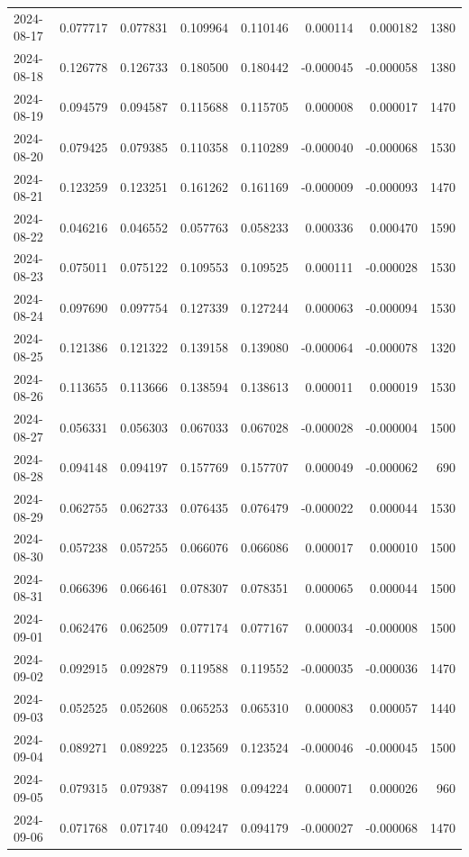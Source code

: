 \begin{tabular}{lrrrrrrr}
2024-08-17 & 0.077717 & 0.077831 & 0.109964 & 0.110146 & 0.000114 & 0.000182 & 1380 \\
2024-08-18 & 0.126778 & 0.126733 & 0.180500 & 0.180442 & -0.000045 & -0.000058 & 1380 \\
2024-08-19 & 0.094579 & 0.094587 & 0.115688 & 0.115705 & 0.000008 & 0.000017 & 1470 \\
2024-08-20 & 0.079425 & 0.079385 & 0.110358 & 0.110289 & -0.000040 & -0.000068 & 1530 \\
2024-08-21 & 0.123259 & 0.123251 & 0.161262 & 0.161169 & -0.000009 & -0.000093 & 1470 \\
2024-08-22 & 0.046216 & 0.046552 & 0.057763 & 0.058233 & 0.000336 & 0.000470 & 1590 \\
2024-08-23 & 0.075011 & 0.075122 & 0.109553 & 0.109525 & 0.000111 & -0.000028 & 1530 \\
2024-08-24 & 0.097690 & 0.097754 & 0.127339 & 0.127244 & 0.000063 & -0.000094 & 1530 \\
2024-08-25 & 0.121386 & 0.121322 & 0.139158 & 0.139080 & -0.000064 & -0.000078 & 1320 \\
2024-08-26 & 0.113655 & 0.113666 & 0.138594 & 0.138613 & 0.000011 & 0.000019 & 1530 \\
2024-08-27 & 0.056331 & 0.056303 & 0.067033 & 0.067028 & -0.000028 & -0.000004 & 1500 \\
2024-08-28 & 0.094148 & 0.094197 & 0.157769 & 0.157707 & 0.000049 & -0.000062 & 690 \\
2024-08-29 & 0.062755 & 0.062733 & 0.076435 & 0.076479 & -0.000022 & 0.000044 & 1530 \\
2024-08-30 & 0.057238 & 0.057255 & 0.066076 & 0.066086 & 0.000017 & 0.000010 & 1500 \\
2024-08-31 & 0.066396 & 0.066461 & 0.078307 & 0.078351 & 0.000065 & 0.000044 & 1500 \\
2024-09-01 & 0.062476 & 0.062509 & 0.077174 & 0.077167 & 0.000034 & -0.000008 & 1500 \\
2024-09-02 & 0.092915 & 0.092879 & 0.119588 & 0.119552 & -0.000035 & -0.000036 & 1470 \\
2024-09-03 & 0.052525 & 0.052608 & 0.065253 & 0.065310 & 0.000083 & 0.000057 & 1440 \\
2024-09-04 & 0.089271 & 0.089225 & 0.123569 & 0.123524 & -0.000046 & -0.000045 & 1500 \\
2024-09-05 & 0.079315 & 0.079387 & 0.094198 & 0.094224 & 0.000071 & 0.000026 & 960 \\
2024-09-06 & 0.071768 & 0.071740 & 0.094247 & 0.094179 & -0.000027 & -0.000068 & 1470 \\

\end{tabular}
